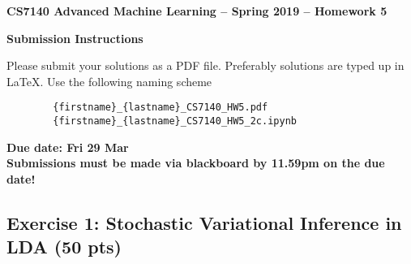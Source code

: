\documentclass [12pt]{article}
\begin{document}
\begin{center}
\textbf{\large CS7140 Advanced Machine Learning -- Spring 2019\vspace{1mm} -- Homework 5}
\end{center}

\begin{framed}
    \textbf{\large Submission Instructions}

    Please submit your solutions as a PDF file. Preferably solutions are typed up in LaTeX. 
    Use the following naming scheme
    \begin{verbatim}
        {firstname}_{lastname}_CS7140_HW5.pdf
        {firstname}_{lastname}_CS7140_HW5_2c.ipynb
    \end{verbatim}
    \textbf{Due date: Fri 29 Mar}\\
    \textbf{Submissions must be made via blackboard by 11.59pm on the due date!}
\end{framed}

\subsection*{Exercise 1: Stochastic Variational Inference in LDA (50 pts)}
\end{document}

